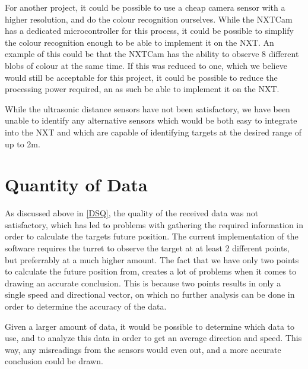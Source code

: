 For another project, it could be possible to use a cheap camera sensor with a
higher resolution, and do the colour recognition ourselves. While the NXTCam has
a dedicated microcontroller for this process, it could be possible to simplify
the colour recognition enough to be able to implement it on the NXT. An example
of this could be that the NXTCam has the ability to observe 8 different blobs of
colour at the same time. If this was reduced to one, which we believe would
still be acceptable for this project, it could be possible to reduce the
processing power required, an as such be able to implement it on the NXT.\nl

While the ultrasonic distance sensors have not been satisfactory, we have been
unable to identify any alternative sensors which would be both easy to integrate
into the NXT and which are capable of identifying targets at the desired range
of up to 2m.

\section{Quantity of Data}
As discussed above in \autoref{DSQ}, the quality of the received data was not
satisfactory, which has led to problems with gathering the required information
in order to calculate the targets future position. The current implementation of
the \name software requires the turret to observe the target at at least 2
different points, but preferrably at a much higher amount.\nl
The fact that we have only two points to calculate the future position from,
creates a lot of problems when it comes to drawing an accurate conclusion. This
is because two points results in only a single speed and directional vector, on
which no further analysis can be done in order to determine the accuracy of the
data.\nl

Given a larger amount of data, it would be possible to determine which data to
use, and to analyze this data in order to get an average direction and speed.
This way, any misreadings from the sensors would even out, and a more accurate
conclusion could be drawn.\nl

